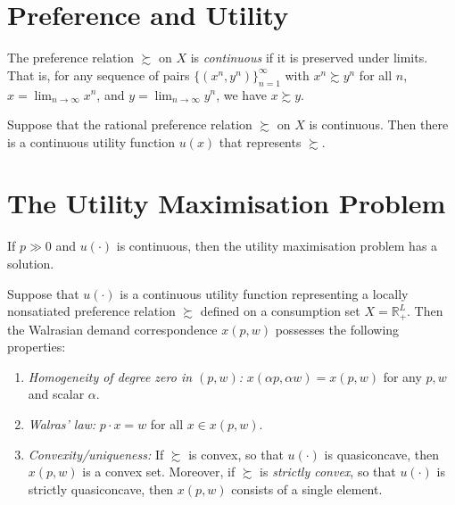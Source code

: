 \section{Preference and Utility}

\begin{defn}
    The preference relation $\succsim$ on $X$ is \emph{continuous} if it is preserved under limits. That is, for any sequence of pairs $\{(x^n, y^n)\}^\infty_{n = 1}$ with $x^n \succsim y^n$ for all $n$, $x = \lim_{n \rightarrow \infty} x^n$, and $y = \lim_{n \rightarrow \infty} y^n$, we have $x \succsim y$.
\end{defn}

\begin{prop}
    Suppose that the rational preference relation $\succsim$ on $X$ is continuous. Then there is a continuous utility function $u(x)$ that represents $\succsim$.
\end{prop}


\section{The Utility Maximisation Problem}

\begin{prop}
    If $p \gg 0$ and $u(\cdot)$ is continuous, then the utility maximisation problem has a solution.
\end{prop}

\begin{prop}
    Suppose that $u(\cdot)$ is a continuous utility function representing a locally nonsatiated preference relation $\succsim$ defined on a consumption set $X = \mathbb{R}^L_+$. Then the Walrasian demand correspondence $x(p, w)$ possesses the following properties:
    \begin{enumerate}
        \item \emph{Homogeneity of degree zero in $(p, w)$:} $x(\alpha p, \alpha w) = x(p, w)$ for any $p, w$ and scalar $\alpha$.
        \item \emph{Walras' law:} $p \cdot x = w$ for all $x \in x(p, w)$.
        \item \emph{Convexity/uniqueness:} If $\succsim$ is convex, so that $u(\cdot)$ is quasiconcave, then $x(p, w)$ is a convex set. Moreover, if $\succsim$ is \emph{strictly convex}, so that $u(\cdot)$ is strictly quasiconcave, then $x(p, w)$ consists of a single element.
    \end{enumerate}
\end{prop}

